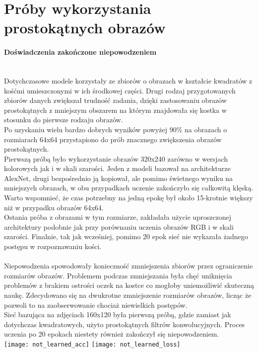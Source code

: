\section{Próby wykorzystania prostokątnych obrazów}
\paragraph{Doświadczenia zakończone niepowodzeniem} \mbox{}\\
Dotychczasowe modele korzystały ze zbiorów o obrazach w kształcie kwadratów z kośćmi
umieszczonymi w ich środkowej części. Drugi rodzaj przygotowanych zbiorów danych zwiększał
trudność zadania, dzięki zastosowaniu obrazów prostokątnych z mniejszym obszarem na
którym znajdowała się kostka w stosunku do pierwsze rodzaju obrazów.\\
Po uzyskaniu wielu bardzo dobrych wyników powyżej 90\% na obrazach o rozmiarach 64x64
przystapiono do prób znacznego zwiększenia obrazów prostokątnych.\\
Pierwszą próbą było wykorzystanie obrazów 320x240 zarówno w wersjach kolorowych jak
i w skali szarości. Jeden z modeli bazował na architekturze AlexNet, drugi bezpośrednio
ją kopiował, ale pomimo świetnego wyniku na mniejszych obrazach, w obu przypadkach
uczenie zakończyło się całkowitą klęską. Warto wspomnieć, że czas potrzebny na
jedną epokę był około 15-krotnie większy niż w przypadku obrazów 64x64.\\
Ostania próba z obrazami w tym rozmiarze, zakładała użycie uproszczonej architektury
podobnie jak przy porównaniu uczenia obrazów RGB i w skali szarości. Finalnie, tak jak
wcześniej, pomimo 20 epok sieć nie wykazała żadnego postępu w rozpoznawaniu kości.\\\\
Niepowodzenia spowodowały konieczność zmniejszenia zbiorów przez ograniczenie rozmiarów obrazów.
Problemem podczas zmniejszania była chęć uniknięcia problemów z brakiem ostrości
oczek na kostce co mogłoby uniemożliwić skuteczną naukę. Zdecydowano się na dwukrotne
zmniejszenie rozmiarów obrazów, licząc że pozwoli to na zaobserwowanie chociaż niewielkich
postępów.\\
Sieć bazująca na zdjęciach 160x120 była pierwszą próbą, gdzie zamiast jak dotychczas
kwadratowych, użyto prostokątnych filtrów konwolucyjnych. Proces uczenia po 20 epokach
niestety również zakończył się niepowodzeniem.\\
\texttt{[image: not\_learned\_acc]}
\texttt{[image: not\_learned\_loss]}

